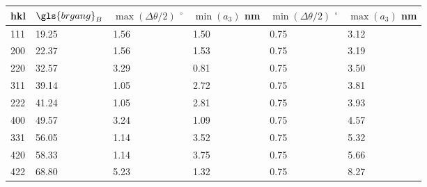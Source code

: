 \begin{tabularx}{\linewidth}{|X|X|X|X|X|X|}
\hline
hkl & \( \gls{brgang}_B \) & \( \max \left( \Delta \theta / 2 \right) \) \(^{\circ}\) & \( \min \left( a_3 \right) \) nm & \( \min \left( \Delta \theta / 2 \right) \) \(^{\circ}\) & \( \max \left( a_3 \right) \) nm \\
\hline
111 & 19.25 & 1.56 & 1.50 & 0.75 & 3.12 \\
\hline
200 & 22.37 & 1.56 & 1.53 & 0.75 & 3.19 \\
\hline
220 & 32.57 & 3.29 & 0.81 & 0.75 & 3.50 \\
\hline
311 & 39.14 & 1.05 & 2.72 & 0.75 & 3.81 \\
\hline
222 & 41.24 & 1.05 & 2.81 & 0.75 & 3.93 \\
\hline
400 & 49.57 & 3.24 & 1.09 & 0.75 & 4.57 \\
\hline
331 & 56.05 & 1.14 & 3.52 & 0.75 & 5.32 \\
\hline
420 & 58.33 & 1.14 & 3.75 & 0.75 & 5.66 \\
\hline
422 & 68.80 & 5.23 & 1.32 & 0.75 & 8.27 \\
\hline
\end{tabularx}
